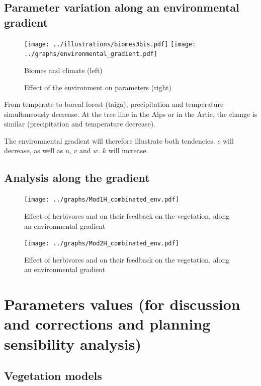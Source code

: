 \subsection*{Parameter variation along an environmental gradient}

\begin{figure}[!h]
\centering
\texttt{[image: ../illustrations/biomes3bis.pdf]}
\texttt{[image: ../graphs/environmental\_gradient.pdf]}
\caption{Biomes and climate (left)}
\caption{Effect of the environment on parameters (right)}
\end{figure}

From temperate to boreal forest (taiga), precipitation and temperature simultaneously decrease. At the tree line in the Alps or in the Artic, the change is similar (precipitation and temperature decrease).

The environmental gradient will therefore illustrate both tendencies. $c$ will decrease, as well as $u$, $v$ and $w$. $k$ will increase.


\newpage
\subsection*{Analysis along the gradient}

\begin{figure}[!h]
\centering
\texttt{[image: ../graphs/Mod1H\_combinated\_env.pdf]}
\caption{Effect of herbivores and on their feedback on the vegetation, along an environmental gradient}
\end{figure}

\newpage
\begin{figure}[!h]
\centering
\texttt{[image: ../graphs/Mod2H\_combinated\_env.pdf]}
\caption{Effect of herbivores and on their feedback on the vegetation, along an environmental gradient}
\end{figure}





\newpage
\section{Parameters values (for discussion and corrections and planning sensibility analysis)}

\subsection*{Vegetation models}


